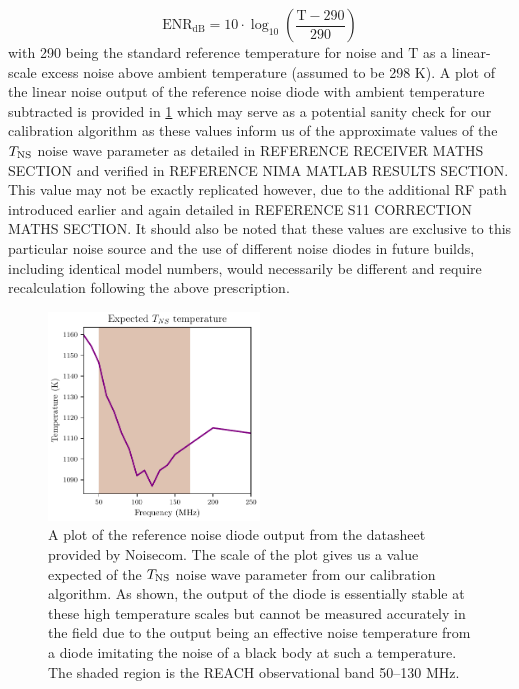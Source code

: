 \begin{equation}
    \mathrm{ENR_{dB}} = 10 \cdot \log_{10} \left( \frac{\mathrm{T} - 290}{290}\right)
\end{equation}
with 290 being the standard reference temperature for noise and $\mathrm{T}$ as a linear-scale excess noise above ambient temperature (assumed to be 298 K). A plot of the linear noise output of the reference noise diode with ambient temperature subtracted is provided in \cref{fig:ns_diode} which may serve as a potential sanity check for our calibration algorithm as these values inform us of the approximate values of the $T_{\mathrm{NS}}$ noise wave parameter as detailed in REFERENCE RECEIVER MATHS SECTION and verified in REFERENCE NIMA MATLAB RESULTS SECTION. This value may not be exactly replicated however, due to the additional RF path introduced earlier and again detailed in REFERENCE S11 CORRECTION MATHS SECTION. It should also be noted that these values are exclusive to this particular noise source and the use of different noise diodes in future builds, including identical model numbers, would necessarily be different and require recalculation following the above prescription.
\begin{figure}
    \centering
    \includegraphics[width=0.5\textwidth]{ns_diode}
    \caption{A plot of the reference noise diode output from the datasheet provided by Noisecom. The scale of the plot gives us a value expected of the $T_{\mathrm{NS}}$ noise wave parameter from our calibration algorithm. As shown, the output of the diode is essentially stable at these high temperature scales but cannot be measured accurately in the field due to the output being an effective noise temperature from a diode imitating the noise of a black body at such a temperature. The shaded region is the REACH observational band 50--130 MHz.}
    \label{fig:ns_diode}
\end{figure}


